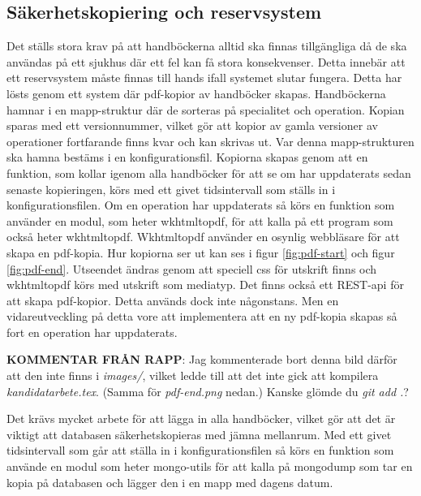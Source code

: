 \documentclass{article}
\begin{document}
\subsection{Säkerhetskopiering och reservsystem}
Det ställs stora krav på att handböckerna alltid ska finnas tillgängliga då de ska användas på ett sjukhus där ett fel kan få stora konsekvenser. Detta innebär att ett reservsystem måste finnas till hands ifall systemet slutar fungera. Detta har lösts genom ett system där pdf-kopior av handböcker skapas. Handböckerna hamnar i en mapp-struktur där de sorteras på specialitet och operation. Kopian sparas med ett versionnummer, vilket gör att kopior av gamla versioner av operationer fortfarande finns kvar och kan skrivas ut. Var denna mapp-strukturen ska hamna bestäms i en konfigurationsfil.
Kopiorna skapas genom att en funktion, som kollar igenom alla handböcker för att se om har uppdaterats sedan senaste kopieringen, körs med ett givet tidsintervall som ställs in i konfigurationsfilen. Om en operation har uppdaterats så körs en funktion som använder en modul, som heter wkhtmltopdf, för att kalla på ett program som också heter wkhtmltopdf. Wkhtmltopdf använder en osynlig webbläsare för att skapa en pdf-kopia. Hur kopiorna ser ut kan ses i figur \ref{fig:pdf-start} och figur \ref{fig:pdf-end}. Utseendet ändras genom att speciell css för utskrift finns och wkhtmltopdf körs med utskrift som mediatyp. 
Det finns också ett REST-api för att skapa pdf-kopior. Detta används dock inte någonstans. Men en vidareutveckling på detta vore att implementera att en ny pdf-kopia skapas så fort en operation har uppdaterats. 

\textbf{KOMMENTAR FRÅN RAPP}: Jag kommenterade bort denna bild
därför att den inte finns i \textit{images/}, vilket
ledde till att det inte gick att kompilera \textit{kandidatarbete.tex}.
(Samma för \textit{pdf-end.png} nedan.) Kanske glömde du \textit{git add .}?


Det krävs mycket arbete för att lägga in alla handböcker, vilket gör att det är viktigt att databasen säkerhetskopieras med jämna mellanrum. Med ett givet tidsintervall som går att ställa in i konfigurationsfilen så körs en funktion som använde en modul som heter mongo-utils för att kalla på mongodump som tar en kopia på databasen och lägger den i en mapp med dagens datum. 
\end{document}
